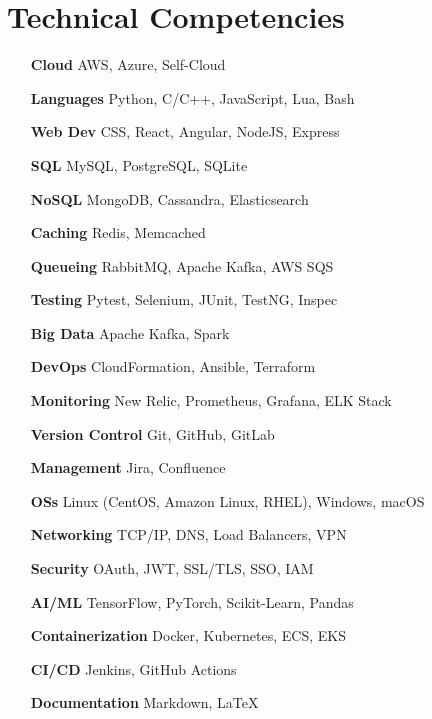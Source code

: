 \section{Technical Competencies}

\begin{multicols}{2}
    \begin{itemize}[itemsep=-2px, parsep=1pt, leftmargin=75pt]
        \item[\textbf{Cloud}] AWS, Azure, Self-Cloud
        \item[\textbf{Languages}] Python, C/C++, JavaScript, Lua, Bash
        \item[\textbf{Web Dev}] CSS, React, Angular, NodeJS, Express
        \item[\textbf{SQL}] MySQL, PostgreSQL, SQLite
        \item[\textbf{NoSQL}] MongoDB, Cassandra, Elasticsearch
        \item[\textbf{Caching}] Redis, Memcached
        \item[\textbf{Queueing}] RabbitMQ, Apache Kafka, AWS SQS
        \item[\textbf{Testing}] Pytest, Selenium, JUnit, TestNG, Inspec
        \item[\textbf{Big Data}] Apache Kafka, Spark
        \item[\textbf{DevOps}] CloudFormation, Ansible, Terraform
        \item[\textbf{Monitoring}] New Relic, Prometheus, Grafana, ELK Stack
        \item[\textbf{Version Control}] Git, GitHub, GitLab
        \item[\textbf{Management}] Jira, Confluence
        \item[\textbf{OSs}] Linux (CentOS, Amazon Linux, RHEL), Windows, macOS
        \item[\textbf{Networking}] TCP/IP, DNS, Load Balancers, VPN
        \item[\textbf{Security}] OAuth, JWT, SSL/TLS, SSO, IAM
        \item[\textbf{AI/ML}] TensorFlow, PyTorch, Scikit-Learn, Pandas
        \item[\textbf{Containerization}] Docker, Kubernetes, ECS, EKS
        \item[\textbf{CI/CD}] Jenkins, GitHub Actions
        \item[\textbf{Documentation}] Markdown, LaTeX
    \end{itemize}
\end{multicols}